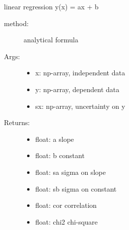 \documentclass[letterpaper,10pt,english]{sphinxmanual}
\begin{document}

\begin{fulllineitems}
\label{\detokenize{index:PhyPraKit.PhyPraKit.linRegression}}
linear regression y(x) = ax + b
\begin{description}
\item[{method: }] \leavevmode
analytical formula

\item[{Args:}] \leavevmode\begin{itemize}
\item {} 
x: np-array, independent data

\item {} 
y: np-array, dependent data

\item {} 
sx: np-array, uncertainty on y

\end{itemize}

\item[{Returns:}] \leavevmode\begin{itemize}
\item {} 
float: a     slope

\item {} 
float: b     constant

\item {} 
float: sa  sigma on slope

\item {} 
float: sb  sigma on constant

\item {} 
float: cor   correlation

\item {} 
float: chi2  chi-square

\end{itemize}

\end{description}

\end{fulllineitems}

\end{document}
